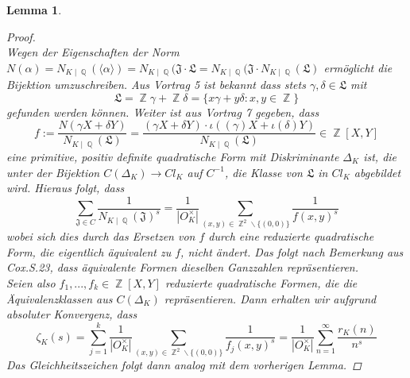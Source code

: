 \documentclass[10pt,a4paper]{article}
\theoremstyle{plain}
\newtheorem{lem}[thm]{Lemma}
\theoremstyle{definition}
\theoremstyle{remark}
\DeclareMathOperator{\Q}{\mathbb{Q}}
\DeclareMathOperator{\Z}{\mathbb{Z}}
\begin{document}
\begin{lem}
\begin{proof}
\\
Wegen der Eigenschaften der Norm $N(\alpha)= N_{K\mid \Q}(\langle \alpha \rangle)=N_{K\mid \Q}(\mathfrak{J\cdot L}=N_{K\mid \Q}(\mathfrak{J}\cdot N_{K\mid \Q}(\mathfrak{L})$ ermöglicht die Bijektion umzuschreiben. Aus Vortrag 5 ist bekannt dass stets $\gamma, \delta \in \mathfrak{L}$ mit $$\mathfrak{L}= \Z\gamma+\Z\delta = \{x\gamma+y\delta\colon x,y \in \Z\}$$ gefunden werden können. Weiter ist aus Vortrag 7 gegeben, dass $$f:=\frac{N(\gamma X+\delta Y)}{N_{K\mid \Q}(\mathfrak{L})}=\frac{(\gamma X + \delta Y)\cdot \iota((\gamma)X+\iota(\delta)Y)}{N_{K\mid \Q}(\mathfrak{L})} \in \Z[X,Y]$$eine primitive, positiv definite quadratische Form mit Diskriminante $\Delta_K$ ist, die unter der Bijektion $C(\Delta_K)\rightarrow Cl_K$ auf $C^{-1}$, die Klasse von $\mathfrak{L}$ in $Cl_K$ abgebildet wird. Hieraus folgt, dass $$\sum_{\mathfrak{J}\in C}\frac{1}{N_{K\mid \Q }(\mathfrak{J})^s}=\frac{1}{|O_K^{\times}|}\sum_{(x,y)\in \Z^2\backslash \{ (0,0)\}}\frac{1}{f(x,y)^s}$$wobei sich dies durch das Ersetzen von $f$ durch eine reduzierte quadratische Form, die eigentlich äquivalent zu $f$, nicht ändert. Das folgt nach Bemerkung aus Cox.S.23, dass äquivalente Formen dieselben Ganzzahlen repräsentieren.
\\
Seien also $f_1,...,f_k \in \Z[X,Y]$ reduzierte quadratische Formen, die die Äquivalenzklassen aus $C(\Delta_K)$ repräsentieren. Dann erhalten wir aufgrund absoluter Konvergenz, dass $$\zeta_K(s) = \sum_{j=1}^{k}\frac{1}{|O_K^{\times}|}\sum_{(x,y) \in \Z^2 \backslash \{(0,0)\}}\frac{1}{f_j(x,y)^s}=\frac{1}{|O_K^{\times}|}\sum_{n=1}^{\infty}\frac{r_K(n)}{n^s}$$
Das Gleichheitszeichen folgt dann analog mit dem vorherigen Lemma.
\end{proof}
\end{lem}
 

\end{document}
